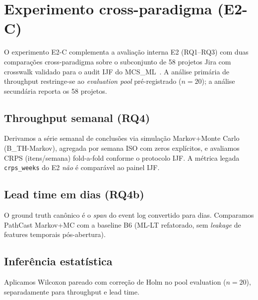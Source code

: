 
\section{Experimento cross-paradigma (E2-C)}
\label{sec:e2c}

O experimento E2-C complementa a avaliação interna E2 (RQ1--RQ3) com duas comparações
cross-paradigma sobre o subconjunto de 58 projetos Jira com crosswalk validado para o
audit IJF do MCS\_ML~\cite{oliveira2026mcsml}. A análise primária de throughput restringe-se ao
\emph{evaluation pool} pré-registrado ($n=20$); a análise secundária reporta os 58 projetos.

\subsection{Throughput semanal (RQ4)}
\label{sec:e2c-throughput}

Derivamos a série semanal de conclusões via simulação Markov+Monte Carlo
(B\_TH-Markov), agregada por semana ISO com zeros explícitos, e avaliamos CRPS
(itens/semana) fold-a-fold conforme o protocolo IJF. A métrica legada
\texttt{crps\_weeks} do E2 \emph{não} é comparável ao painel IJF.



\subsection{Lead time em dias (RQ4b)}
\label{sec:e2c-leadtime}

O ground truth canônico é o \emph{span} do event log convertido para dias.
Comparamos PathCast Markov+MC com a baseline B6 (ML-LT refatorado, sem \emph{leakage}
de features temporais pós-abertura).



\subsection{Inferência estatística}
\label{sec:e2c-stats}

Aplicamos Wilcoxon pareado com correção de Holm no pool evaluation ($n=20$),
separadamente para throughput e lead time.



